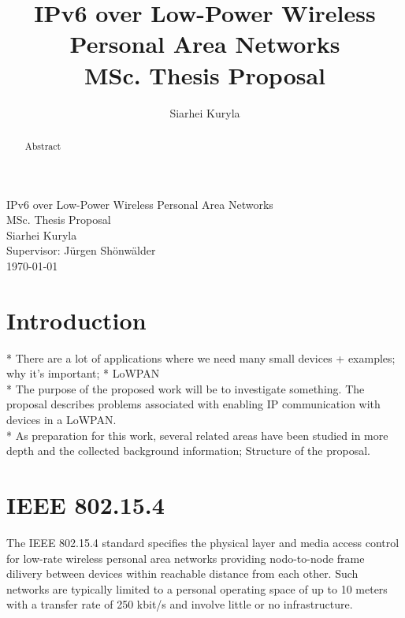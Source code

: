 \documentclass[12pt, titlepage, a4paper]{report}
\title{IPv6 over Low-Power Wireless Personal Area Networks\\ MSc. Thesis Proposal}
\author{Siarhei Kuryla}
\begin{document}
\begin{titlepage}

\begin{center}


\huge IPv6 over Low-Power Wireless Personal Area Networks\\ [0.5cm]

\Large MSc. Thesis Proposal\\ [0.5cm]
Siarhei Kuryla\\ [0.5cm]

\large Supervisor: J\"urgen Sh\"onw\"alder\\[0.5cm]
{\large \today}


\end{center}
\end{titlepage}

\newpage
\thispagestyle{empty}

\newpage
\begin{abstract}
Abstract
\end{abstract}

\newpage
\tableofcontents
\newpage

\chapter{Introduction}
* There are a lot of applications where we need many small devices + examples; why it's important;
* LoWPAN\\
* The purpose of the proposed work will be to investigate something. The proposal describes problems associated with enabling IP communication with devices in a LoWPAN.\\
* As preparation for this work, several related areas have been studied in more
depth and the collected background information; Structure of the proposal.\\

\chapter{IEEE 802.15.4}\label{ch:ieee802.15.4}
The IEEE 802.15.4 standard \cite{ieee802.15.4} specifies the physical layer and media access control for low-rate wireless personal area networks providing nodo-to-node frame dilivery between devices within reachable distance from each other. Such networks are typically limited to a personal operating space of up to 10 meters with a transfer rate of 250 kbit/s and involve little or no infrastructure.
\end{document}
